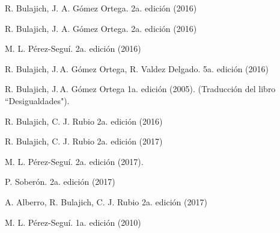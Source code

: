 R. Bulajich, J. A. Gómez Ortega.
2a. edición (2016)

R. Bulajich, J. A. Gómez Ortega.
2a. edición (2016)

M. L. Pérez-Seguí.
2a. edición (2016)

R. Bulajich, J.\,A. Gómez Ortega, R. Valdez Delgado. 
5a. edición (2016)

R. Bulajich, J.\,A. Gómez Ortega 
1a. edición (2005).
(Traducción del libro ``Desigualdades").

R. Bulajich, C. J. Rubio 
2a. edición (2016)

R. Bulajich, C. J. Rubio 
2a. edición (2017)


M. L. Pérez-Seguí.
2a. edición (2017).

P. Soberón.
2a. edición (2017)

A. Alberro, R. Bulajich, C. J. Rubio
2a. edición (2017)

M. L. Pérez-Seguí. 
1a. edición (2010)

